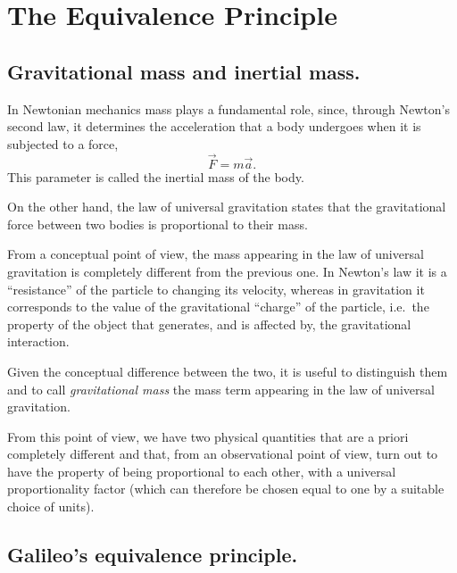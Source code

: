 \chapter{The Equivalence Principle}

\section{Gravitational mass and inertial mass.}

\begin{points}
\item In Newtonian mechanics mass plays a fundamental role, since, through Newton's second law, it determines the acceleration that a body undergoes when it is subjected to a force,
\[
  \vec F=m\vec a .
\]
This parameter is called the inertial mass of the body.

\item On the other hand, the law of universal gravitation states that the gravitational force between two bodies is proportional to their mass.

\item From a conceptual point of view, the mass appearing in the law of universal gravitation is completely different from the previous one. In Newton's law it is a ``resistance'' of the particle to changing its velocity, whereas in gravitation it corresponds to the value of the gravitational ``charge'' of the particle, i.e.\ the property of the object that generates, and is affected by, the gravitational interaction.

\item Given the conceptual difference between the two, it is useful to distinguish them and to call \emph{gravitational mass} the mass term appearing in the law of universal gravitation.

\item From this point of view, we have two physical quantities that are a priori completely different and that, from an observational point of view, turn out to have the property of being proportional to each other, with a universal proportionality factor (which can therefore be chosen equal to one by a suitable choice of units).
\end{points}

\section{Galileo's equivalence principle.}

